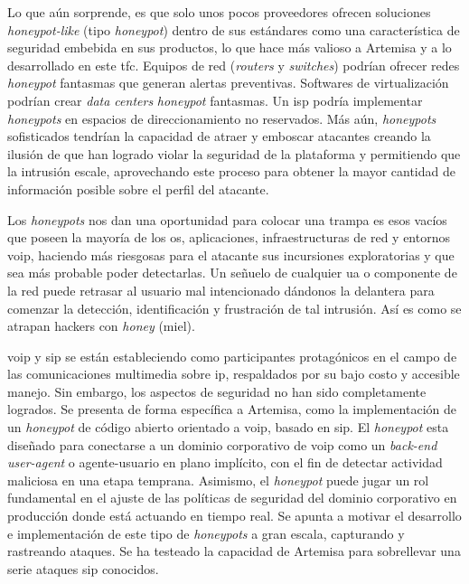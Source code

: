 \documentclass[a4paper,12pt]{report}
\begin{document}
Lo que aún sorprende, es que solo unos pocos proveedores ofrecen soluciones
\emph{honeypot-like} (tipo \emph{honeypot}) dentro de sus estándares como una característica
de seguridad embebida en sus productos, lo que hace más valioso a Artemisa y 
a lo desarrollado en este \ac{tfc}. Equipos de red (\emph{routers} y \emph{switches})
podrían ofrecer redes \emph{honeypot} fantasmas que generan alertas preventivas.
Softwares de virtualización podrían crear \emph{data centers} \emph{honeypot} fantasmas. Un
\ac{isp} podría implementar \emph{honeypots} en espacios de direccionamiento no reservados. Más
aún, \emph{honeypots} sofisticados tendrían la capacidad de atraer y emboscar atacantes 
creando la ilusión de que han logrado violar la seguridad de la plataforma y permitiendo que 
la intrusión escale, aprovechando este proceso para obtener la mayor cantidad de información
posible sobre el perfil del atacante.

Los \emph{honeypots} nos dan una oportunidad para colocar una trampa es esos vacíos que 
poseen la mayoría de los \ac{os}, aplicaciones, infraestructuras de red y entornos \ac{voip}, 
haciendo más riesgosas para el atacante sus incursiones exploratorias y que sea más probable
poder detectarlas. Un señuelo de cualquier \ac{ua} o componente de la red puede retrasar al
usuario mal intencionado dándonos la delantera para comenzar la detección, identificación y 
frustración de tal intrusión. Así es como se atrapan hackers con \emph{honey} (miel). \cite{antonopolous}

\ac{voip} y \ac{sip} se están estableciendo como participantes
protagónicos en el campo de las comunicaciones multimedia sobre \ac{ip},
respaldados por su bajo costo y accesible manejo. Sin embargo, los
aspectos de seguridad no han sido completamente logrados. Se presenta de
forma específica a Artemisa, como la implementación de un
\emph{honeypot} de código abierto orientado a \ac{voip}, basado en \ac{sip}. El \emph{honeypot} esta
diseñado para conectarse a un dominio corporativo de \ac{voip} como un
\emph{back-end user-agent} o agente-usuario en plano implícito, con el
fin de detectar actividad maliciosa en una etapa temprana. Asimismo, el
\emph{honeypot} puede jugar un rol fundamental en el ajuste de las políticas de
seguridad del dominio corporativo en producción donde está actuando en
tiempo real. Se apunta a motivar el desarrollo e implementación de este
tipo de \emph{honeypots} a gran escala, capturando y rastreando ataques. Se ha
testeado la capacidad de Artemisa para sobrellevar una serie ataques \ac{sip}
conocidos. \cite{docarmof}
\end{document}
